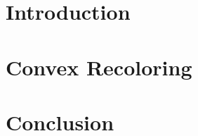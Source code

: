 \newcommand{\defpath}[1]{\def\path{content/#1}}
\newcommand{\add}[1]{}

\defpath{introduction}
\chapter*{Introduction}
\add{introduction}

\defpath{2cr}
\chapter*{Convex Recoloring}
\add{2cr}

\defpath{conclusion}
\chapter*{Conclusion}
\add{conclusion}